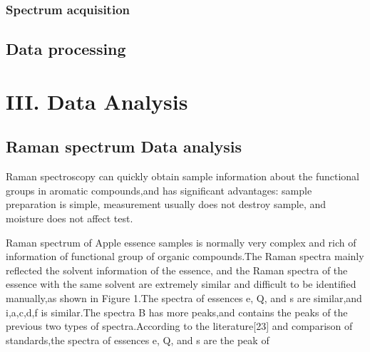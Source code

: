 \documentclass[a4paper]{article}
\begin{document}
\subsubsection{Spectrum acquisition}

\subsection{Data processing}


\section{III. Data Analysis}
\subsection{Raman spectrum Data analysis}
Raman spectroscopy can quickly obtain sample information about the functional groups in aromatic compounds,and has significant advantages: sample preparation is simple, measurement usually does not destroy sample, and moisture does not affect test.

Raman spectrum of Apple essence samples is normally very complex and rich of information of functional group of organic compounds.The Raman spectra mainly reflected the solvent information of the essence, and the Raman spectra of the essence with the same solvent are extremely similar and difficult to be identified manually,as shown in Figure 1.The spectra of essences e, Q, and s are similar,and i,a,c,d,f is similar.The spectra B has more peaks,and contains the peaks of the previous two types of spectra.According to the literature[23] and comparison of standards,the spectra of essences e, Q, and s are the peak of

\end{document}

